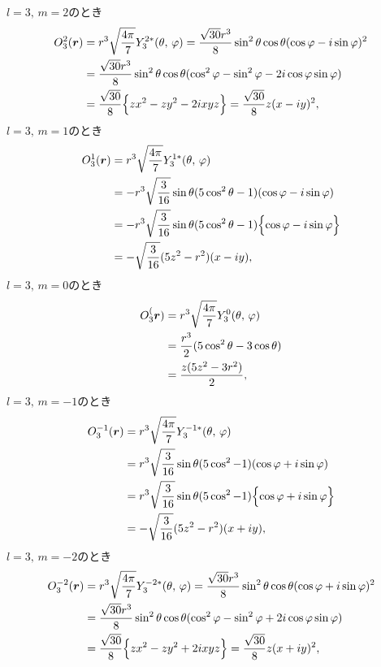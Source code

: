 \documentclass[../../master.tex]{subfiles}
\begin{document}
\(l=3,\,m=2\)のとき
\begin{align}
    O_3^2(\vb*{r})
    &= r^3 \sqrt{\frac{4\pi}{7}} Y_3^{2*}(\theta,\,\varphi)
    = \frac{\sqrt{30}r^3}{8} \sin^2\theta \cos\theta (\cos\varphi-i\sin\varphi)^2\\
    &= \frac{\sqrt{30}r^3}{8} \sin^2\theta \cos\theta (\cos^2\varphi - \sin^2\varphi - 2i\cos\varphi\sin\varphi)\\
    &= \frac{\sqrt{30}}{8} \Big\{zx^2-zy^2 -2ixyz\Big\}
    = \frac{\sqrt{30}}{8} z(x-iy)^2,
\end{align}
\(l=3,\,m=1\)のとき
\begin{align}
    O_3^1(\vb*{r})
    &= r^3 \sqrt{\frac{4\pi}{7}} Y_3^{1*}(\theta,\,\varphi)\\
    &= -r^3 \sqrt{\frac{3}{16}} \sin\theta(5\cos^2\theta-1)(\cos\varphi-i\sin\varphi)\\
    &= -r^3 \sqrt{\frac{3}{16}} \sin\theta(5\cos^2\theta-1)
    \Bigl\{\cos\varphi-i\sin\varphi\Bigr\}\\
    &=-\sqrt{\frac{3}{16}}(5z^2-r^2)(x-iy),
\end{align}
\(l=3,\,m=0\)のとき
\begin{align}
    O_3^(\vb*{r})
    &= r^3 \sqrt{\frac{4\pi}{7}} Y_3^{0}(\theta,\,\varphi)\\
    &= \frac{r^3}{2}  (5\cos^2\theta-3\cos\theta)\\
    &= \frac{z(5z^2-3r^2)}{2},
\end{align}
\(l=3,\,m=-1\)のとき
\begin{align}
    O_3^{-1}(\vb*{r})
    &= r^3 \sqrt{\frac{4\pi}{7}} Y_3^{-1*}(\theta,\,\varphi)\\
    &= r^3 \sqrt{\frac{3}{16}} \sin\theta(5\cos^2-1)(\cos\varphi+i\sin\varphi)\\
    &= r^3 \sqrt{\frac{3}{16}} \sin\theta(5\cos^2-1)
    \Bigl\{\cos\varphi+i\sin\varphi\Bigr\}\\
    &=-\sqrt{\frac{3}{16}}(5z^2-r^2)(x+iy),
\end{align}
\(l=3,\,m=-2\)のとき
\begin{align}
    O_3^{-2}(\vb*{r})
    &= r^3 \sqrt{\frac{4\pi}{7}} Y_3^{-2*}(\theta,\,\varphi)
    = \frac{\sqrt{30}r^3}{8} \sin^2\theta \cos\theta (\cos\varphi+i\sin\varphi)^2\\
    &= \frac{\sqrt{30}r^3}{8} \sin^2\theta \cos\theta (\cos^2\varphi - \sin^2\varphi + 2i\cos\varphi\sin\varphi)\\
    &= \frac{\sqrt{30}}{8} \Big\{zx^2-zy^2 + 2ixyz\Big\}
    = \frac{\sqrt{30}}{8} z(x+iy)^2,
\end{align}
\end{document}
